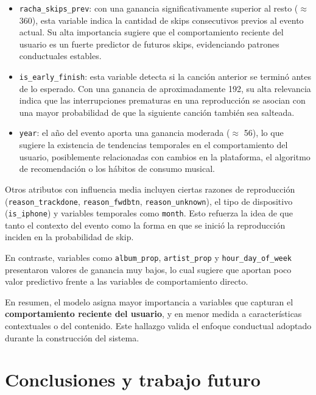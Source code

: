 \documentclass{article}
\begin{document}
\begin{itemize}
    \item \texttt{racha\_skips\_prev}: con una ganancia significativamente superior al resto ($\approx$ 360), esta variable indica la cantidad de skips consecutivos previos al evento actual. Su alta importancia sugiere que el comportamiento reciente del usuario es un fuerte predictor de futuros skips, evidenciando patrones conductuales estables.
    
    \item \texttt{is\_early\_finish}: esta variable detecta si la canción anterior se terminó antes de lo esperado. Con una ganancia de aproximadamente 192, su alta relevancia indica que las interrupciones prematuras en una reproducción se asocian con una mayor probabilidad de que la siguiente canción también sea salteada.
    
    \item \texttt{year}: el año del evento aporta una ganancia moderada ($\approx$ 56), lo que sugiere la existencia de tendencias temporales en el comportamiento del usuario, posiblemente relacionadas con cambios en la plataforma, el algoritmo de recomendación o los hábitos de consumo musical.
\end{itemize}

Otros atributos con influencia media incluyen ciertas razones de reproducción (\texttt{reason\_trackdone}, \texttt{reason\_fwdbtn}, \texttt{reason\_unknown}), el tipo de dispositivo (\texttt{is\_iphone}) y variables temporales como \texttt{month}. Esto refuerza la idea de que tanto el contexto del evento como la forma en que se inició la reproducción inciden en la probabilidad de skip.

En contraste, variables como \texttt{album\_prop}, \texttt{artist\_prop} y \texttt{hour\_day\_of\_week} presentaron valores de ganancia muy bajos, lo cual sugiere que aportan poco valor predictivo frente a las variables de comportamiento directo.

En resumen, el modelo asigna mayor importancia a variables que capturan el \textbf{comportamiento reciente del usuario}, y en menor medida a características contextuales o del contenido. Este hallazgo valida el enfoque conductual adoptado durante la construcción del sistema.

\section*{Conclusiones y trabajo futuro}
\end{document}

